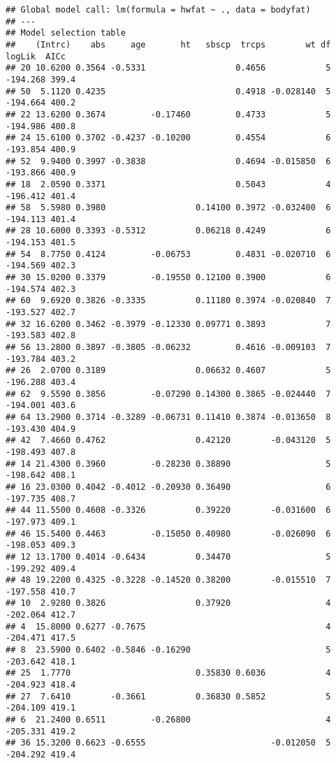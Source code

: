 \documentclass[]{article}
\begin{document}
\begin{verbatim}
## Global model call: lm(formula = hwfat ~ ., data = bodyfat)
## ---
## Model selection table 
##    (Intrc)    abs     age       ht   sbscp  trcps        wt df   logLik  AICc
## 20 10.6200 0.3564 -0.5331                  0.4656            5 -194.268 399.4
## 50  5.1120 0.4235                          0.4918 -0.028140  5 -194.664 400.2
## 22 13.6200 0.3674         -0.17460         0.4733            5 -194.986 400.8
## 24 15.6100 0.3702 -0.4237 -0.10200         0.4554            6 -193.854 400.9
## 52  9.9400 0.3997 -0.3838                  0.4694 -0.015850  6 -193.866 400.9
## 18  2.0590 0.3371                          0.5043            4 -196.412 401.4
## 58  5.5980 0.3980                  0.14100 0.3972 -0.032400  6 -194.113 401.4
## 28 10.6000 0.3393 -0.5312          0.06218 0.4249            6 -194.153 401.5
## 54  8.7750 0.4124         -0.06753         0.4831 -0.020710  6 -194.569 402.3
## 30 15.0200 0.3379         -0.19550 0.12100 0.3900            6 -194.574 402.3
## 60  9.6920 0.3826 -0.3335          0.11180 0.3974 -0.020840  7 -193.527 402.7
## 32 16.6200 0.3462 -0.3979 -0.12330 0.09771 0.3893            7 -193.583 402.8
## 56 13.2800 0.3897 -0.3805 -0.06232         0.4616 -0.009103  7 -193.784 403.2
## 26  2.0700 0.3189                  0.06632 0.4607            5 -196.288 403.4
## 62  9.5590 0.3856         -0.07290 0.14300 0.3865 -0.024440  7 -194.001 403.6
## 64 13.2900 0.3714 -0.3289 -0.06731 0.11410 0.3874 -0.013650  8 -193.430 404.9
## 42  7.4660 0.4762                  0.42120        -0.043120  5 -198.493 407.8
## 14 21.4300 0.3960         -0.28230 0.38890                   5 -198.642 408.1
## 16 23.0300 0.4042 -0.4012 -0.20930 0.36490                   6 -197.735 408.7
## 44 11.5500 0.4608 -0.3326          0.39220        -0.031600  6 -197.973 409.1
## 46 15.5400 0.4463         -0.15050 0.40980        -0.026090  6 -198.053 409.3
## 12 13.1700 0.4014 -0.6434          0.34470                   5 -199.292 409.4
## 48 19.2200 0.4325 -0.3228 -0.14520 0.38200        -0.015510  7 -197.558 410.7
## 10  2.9280 0.3826                  0.37920                   4 -202.064 412.7
## 4  15.8000 0.6277 -0.7675                                    4 -204.471 417.5
## 8  23.5900 0.6402 -0.5846 -0.16290                           5 -203.642 418.1
## 25  1.7770                         0.35830 0.6036            4 -204.923 418.4
## 27  7.6410        -0.3661          0.36830 0.5852            5 -204.109 419.1
## 6  21.2400 0.6511         -0.26800                           4 -205.331 419.2
## 36 15.3200 0.6623 -0.6555                         -0.012050  5 -204.292 419.4

\end{verbatim}
\end{document}
